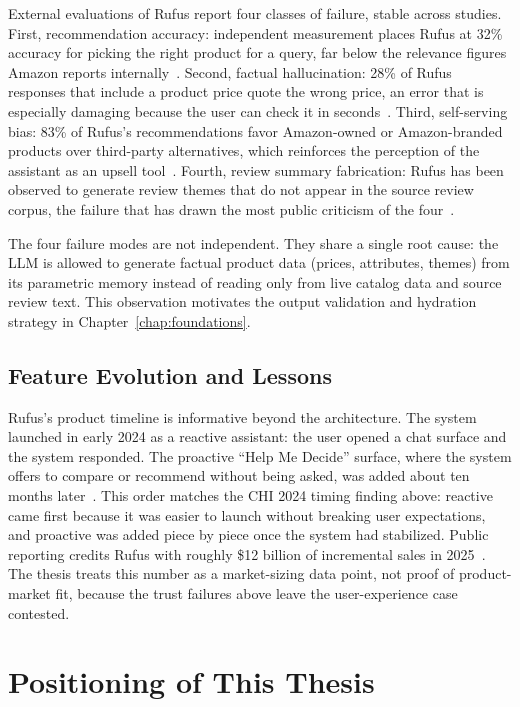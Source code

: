 External evaluations of Rufus report four classes of failure,
stable across studies. First, recommendation accuracy: independent
measurement places Rufus at 32\% accuracy for picking the right
product for a query, far below the relevance figures Amazon
reports internally~\cite{RufusWrong2024}. Second, factual
hallucination: 28\% of Rufus responses that include a product
price quote the wrong price, an error that is especially
damaging because the user can check it in
seconds~\cite{RufusWrong2024}. Third, self-serving bias: 83\% of
Rufus's recommendations favor Amazon-owned or Amazon-branded
products over third-party alternatives, which reinforces the
perception of the assistant as an upsell
tool~\cite{RufusWrong2024}. Fourth, review summary fabrication:
Rufus has been observed to generate review themes that do not
appear in the source review corpus, the failure that has drawn
the most public criticism of the
four~\cite{RufusConfidentlyWrong2024}.

The four failure modes are not independent. They share a single
root cause: the LLM is allowed to generate factual product data
(prices, attributes, themes) from its parametric memory instead
of reading only from live catalog data and source review text.
This observation motivates the output validation and hydration
strategy in Chapter~\ref{chap:foundations}.

\subsection{Feature Evolution and Lessons}
\label{subsec:bg-rufus-lessons}

Rufus's product timeline is informative beyond the architecture.
The system launched in early 2024 as a reactive assistant: the
user opened a chat surface and the system responded. The
proactive ``Help Me Decide'' surface, where the system offers to
compare or recommend without being asked, was added about ten
months later~\cite{RufusTechnology, RufusScaling}. This order
matches the CHI 2024 timing finding above: reactive came first
because it was easier to launch without breaking user
expectations, and proactive was added piece by piece once the
system had stabilized. Public reporting credits Rufus with
roughly \$12 billion of incremental sales in
2025~\cite{RufusRevenue2025}. The thesis treats this number as a
market-sizing data point, not proof of product-market fit,
because the trust failures above leave the user-experience case
contested.

\section{Positioning of This Thesis}
\label{sec:bg-positioning}


